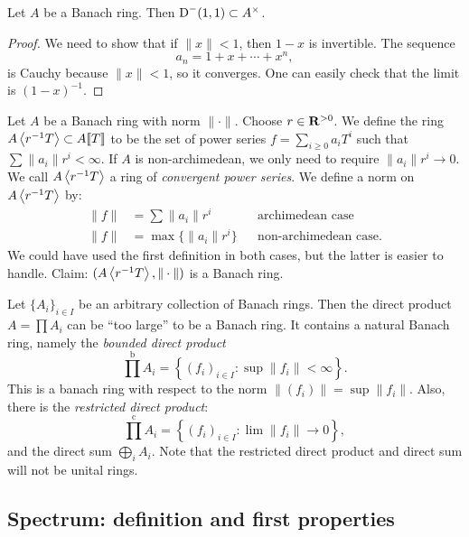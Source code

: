 \begin{lemma}\label{lem:principle-units-invertible}
Let $A$ be a Banach ring. Then $\operatorname{D}^-(1,1)\subset A^\times$. 
\end{lemma}
\begin{proof}
We need to show that if $\|x\|<1$, then $1-x$ is invertible. The sequence 
\[
  a_n = 1 + x + \cdots + x^n ,
\]
is Cauchy because $\|x\|<1$, so it converges. One can easily check that the 
limit is $(1-x)^{-1}$. 
\end{proof}

\begin{example}\label{ex:Tate-algebra}
Let $A$ be a Banach ring with norm $\|\cdot\|$. Choose $r\in \mathbf{R}^{>0}$. We 
define the ring $A\left\langle r^{-1} T \right\rangle\subset A\llbracket T\rrbracket$ to be the set of power 
series $f=\sum_{i\geqslant 0} a_i T^i$ such that 
$\sum \|a_i\| r^i< \infty$. If $A$ is non-archimedean, we only need to require 
$\|a_i\| r^i \to 0$. We call $A\left\langle r^{-1} T \right\rangle$ a ring of \emph{convergent 
power series}. We define a norm on $A\left\langle r^{-1} T \right\rangle$ by: 
\begin{align*}
  \|f\| &= \sum \|a_i\| r^i && \text{archimedean case} \\
  \|f\| &= \max\{ \|a_i\| r^i\} && \text{non-archimedean case} .
\end{align*}
We could have used the first definition in both cases, but the latter is easier 
to handle. Claim: $(A\left\langle r^{-1} T \right\rangle,\|\cdot\|)$ is a Banach ring. 
\end{example}

\begin{example}
Let $\{A_i\}_{i\in I}$ be an arbitrary collection of Banach rings. Then the 
direct product $A=\prod A_i$ can be ``too large'' to be a Banach ring. It 
contains a natural Banach ring, namely the \emph{bounded direct product} 
\[
  \prod^\mathrm{b} A_i = \left\{(f_i)_{i\in I}\colon \sup\|f_i\|<\infty\right\} .
\]
This is a banach ring with respect to the norm 
$\|(f_i)\| = \sup \|f_i\|$. Also, there is the \emph{restricted direct 
product}:
\[
  \prod^\mathrm{c} A_i = \left\{(f_i)_{i\in I}\colon \lim \|f_i\|\to 0\right\} ,
\]
and the direct sum $\bigoplus_i A_i$. Note that the restricted direct product 
and direct sum will not be unital rings. 
\end{example}





\subsection{Spectrum: definition and first properties}

